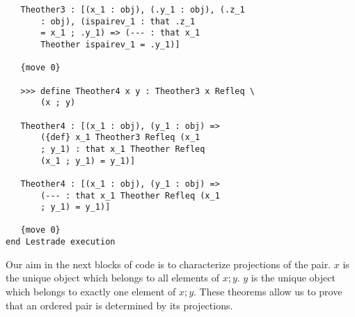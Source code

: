 \documentclass[12pt]{article}
\begin{document}
\begin{verbatim}
   Theother3 : [(x_1 : obj), (.y_1 : obj), (.z_1 
       : obj), (ispairev_1 : that .z_1 
       = x_1 ; .y_1) => (--- : that x_1 
       Theother ispairev_1 = .y_1)]

   {move 0}

   >>> define Theother4 x y : Theother3 x Refleq \
       (x ; y)

   Theother4 : [(x_1 : obj), (y_1 : obj) => 
       ({def} x_1 Theother3 Refleq (x_1 
       ; y_1) : that x_1 Theother Refleq 
       (x_1 ; y_1) = y_1)]

   Theother4 : [(x_1 : obj), (y_1 : obj) => 
       (--- : that x_1 Theother Refleq (x_1 
       ; y_1) = y_1)]

   {move 0}
end Lestrade execution
\end{verbatim}

Our aim in the next blocks of code is to characterize projections of the pair.  $x$ is the unique object which belongs to all elements of $x;y$.  $y$ is the unique object which belongs to exactly one element of $x;y$.  These theorems allow us to prove that an ordered pair is determined by its projections.
\end{document}
